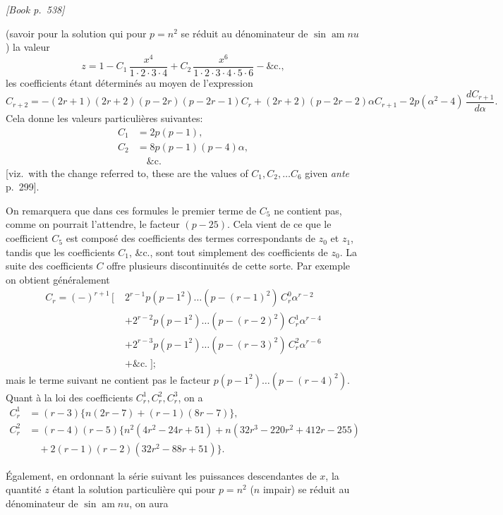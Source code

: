 \documentclass[11pt]{article}
\begin{document}
\medskip
\noindent\textit{[Book p.~538]}\hfill

\smallskip

\noindent (savoir pour la solution qui pour $p = n^{2}$ se r\'eduit au d\'enominateur de $\sin\operatorname{am} nu$) la valeur
\[
z = 1 - C_{1}\,\frac{x^{4}}{1\cdot 2\cdot 3\cdot 4} + C_{2}\,\frac{x^{6}}{1\cdot 2\cdot 3\cdot 4\cdot 5\cdot 6} - \&\text{c.},
\]
les coefficients \'etant d\'etermin\'es au moyen de l'expression
\[
C_{r+2} = -(2r+1)(2r+2)(p-2r)(p-2r-1)C_{r} + (2r+2)(p-2r-2)\alpha C_{r+1} - 2p(\alpha^{2} - 4)\,\frac{dC_{r+1}}{d\alpha}.
\]
Cela donne les valeurs particuli\`eres suivantes:
\[
\begin{aligned}
C_{1} &= 2p(p - 1),\\
C_{2} &= 8p(p - 1)(p - 4)\alpha,\\
&\quad \&\text{c.}
\end{aligned}
\]
[viz.\ with the change referred to, these are the values of $C_{1}, C_{2}, \dots C_{6}$ given \emph{ante} p.~299].

On remarquera que dans ces formules le premier terme de $C_{5}$ ne contient pas, comme on pourrait l'attendre, le facteur $(p - 25)$. Cela vient de ce que le coefficient $C_{5}$ est compos\'e des coefficients des termes correspondants de $z_{0}$ et $z_{1}$, tandis que les coefficients $C_{1}$, \&c., sont tout simplement des coefficients de $z_{0}$. La suite des coefficients $C$ offre plusieurs discontinuit\'es de cette sorte. Par exemple on obtient g\'en\'eralement
\[
\begin{aligned}
C_{r} = (-)^{r+1}\,\bigl[\;& 2^{r-1}p(p-1^{2})\dots(p-(r-1)^{2})\,C_{r}^{0}\alpha^{r-2}\\
& + 2^{r-2}p(p-1^{2})\dots(p-(r-2)^{2})\,C_{r}^{1}\alpha^{r-4}\\
& + 2^{r-3}p(p-1^{2})\dots(p-(r-3)^{2})\,C_{r}^{2}\alpha^{r-6}\\
& + \&\text{c.}\;\bigr];
\end{aligned}
\]
mais le terme suivant ne contient pas le facteur $p(p-1^{2})\dots(p-(r-4)^{2})$. Quant \`a la loi des coefficients $C_{r}^{1}, C_{r}^{2}, C_{r}^{3}$, on a
\[
\begin{aligned}
C_{r}^{1} &= (r-3)\{n(2r-7) + (r-1)(8r-7)\},\\
C_{r}^{2} &= (r-4)(r-5)\{n^{2}(4r^{2} - 24r + 51) + n(32r^{3} - 220r^{2} + 412r - 255)\\
&\quad + 2(r-1)(r-2)(32r^{2} - 88r + 51)\}.
\end{aligned}
\]

\'Egalement, en ordonnant la s\'erie suivant les puissances descendantes de $x$, la quantit\'e $z$ \'etant la solution particuli\`ere qui pour $p = n^{2}$ ($n$ impair) se r\'eduit au d\'enominateur de $\sin\operatorname{am} nu$, on aura
\end{document}
